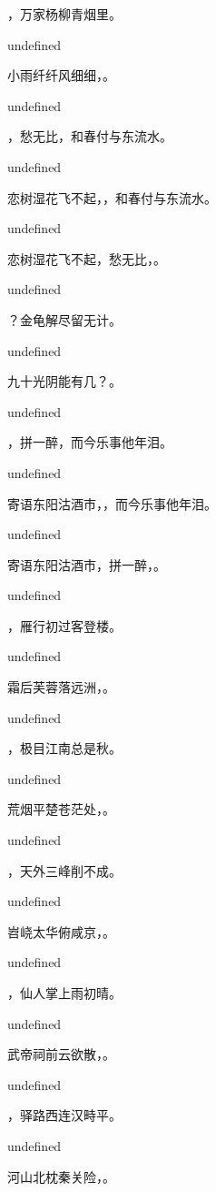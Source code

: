\documentclass[12pt, a4paper, addpoints]{exam}
\begin{document}
\begin{questions}
\question[3] \fillin，万家杨柳青烟里。

undefined

\question[3] 小雨纤纤风细细，\fillin。

undefined

\question[3] \fillin，愁无比，和春付与东流水。

undefined

\question[3] 恋树湿花飞不起，\fillin，和春付与东流水。

undefined

\question[3] 恋树湿花飞不起，愁无比，\fillin。

undefined

\question[3] \fillin？金龟解尽留无计。

undefined

\question[3] 九十光阴能有几？\fillin。

undefined

\question[3] \fillin，拼一醉，而今乐事他年泪。

undefined

\question[3] 寄语东阳沽酒市，\fillin，而今乐事他年泪。

undefined

\question[3] 寄语东阳沽酒市，拼一醉，\fillin。

undefined

\question[3] \fillin，雁行初过客登楼。

undefined

\question[3] 霜后芙蓉落远洲，\fillin。

undefined

\question[3] \fillin，极目江南总是秋。

undefined

\question[3] 荒烟平楚苍茫处，\fillin。

undefined

\question[3] \fillin，天外三峰削不成。

undefined

\question[3] 岧峣太华俯咸京，\fillin。

undefined

\question[3] \fillin，仙人掌上雨初晴。

undefined

\question[3] 武帝祠前云欲散，\fillin。

undefined

\question[3] \fillin，驿路西连汉畤平。

undefined

\question[3] 河山北枕秦关险，\fillin。


\end{questions}
\end{document}
